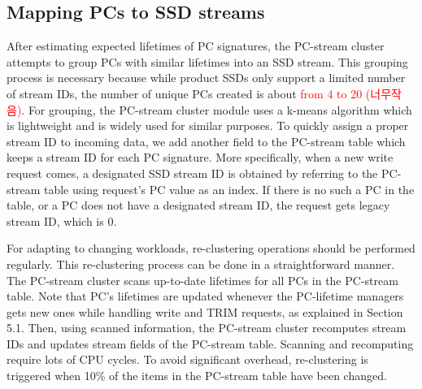
\subsection{Mapping PCs to SSD streams}

After estimating expected lifetimes of PC signatures, the PC-stream cluster
attempts to group PCs with similar lifetimes into an SSD stream.  This grouping
process is necessary because while product SSDs only support a limited number
of stream IDs, the number of unique PCs created is about \textcolor{red}{from 4
to 20 (너무작음)}.  For grouping, the PC-stream cluster module uses a k-means
algorithm which is lightweight and is widely used for similar purposes.  To
quickly assign a proper stream ID to incoming data, we add another field to the
PC-stream table which keeps a stream ID for each PC signature.  More
specifically, when a new write request comes, a designated SSD stream ID is
obtained by referring to the PC-stream table using request's PC value as an
index.  If there is no such a PC in the table, or a PC does not have a
designated stream ID, the request gets legacy stream ID, which is 0.

For adapting to changing workloads, re-clustering operations should be
performed regularly. This re-clustering process can be done in a
straightforward manner. The PC-stream cluster scans up-to-date lifetimes for
all PCs in the PC-stream table. Note that PC's lifetimes are updated whenever
the PC-lifetime managers gets new ones while handling write and TRIM requests,
as explained in Section 5.1.  Then, using scanned information, the PC-stream
cluster recomputes stream IDs and updates stream fields of the PC-stream table.
Scanning and recomputing require lots of CPU cycles.  To avoid significant
overhead, re-clustering is triggered when 10\% of the items in the PC-stream
table have been changed.



